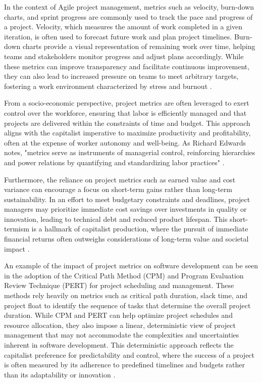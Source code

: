 \begin{refsection}
In the context of Agile project management, metrics such as velocity, burn-down charts, and sprint progress are commonly used to track the pace and progress of a project. Velocity, which measures the amount of work completed in a given iteration, is often used to forecast future work and plan project timelines. Burn-down charts provide a visual representation of remaining work over time, helping teams and stakeholders monitor progress and adjust plans accordingly. While these metrics can improve transparency and facilitate continuous improvement, they can also lead to increased pressure on teams to meet arbitrary targets, fostering a work environment characterized by stress and burnout \cite[pp.~87-90]{Schwaber2020AgileProjectManagement}.

From a socio-economic perspective, project metrics are often leveraged to exert control over the workforce, ensuring that labor is efficiently managed and that projects are delivered within the constraints of time and budget. This approach aligns with the capitalist imperative to maximize productivity and profitability, often at the expense of worker autonomy and well-being. As Richard Edwards notes, "metrics serve as instruments of managerial control, reinforcing hierarchies and power relations by quantifying and standardizing labor practices" \cite[pp.~157-160]{Edwards1980ContestedTerrain}.

Furthermore, the reliance on project metrics such as earned value and cost variance can encourage a focus on short-term gains rather than long-term sustainability. In an effort to meet budgetary constraints and deadlines, project managers may prioritize immediate cost savings over investments in quality or innovation, leading to technical debt and reduced product lifespan. This short-termism is a hallmark of capitalist production, where the pursuit of immediate financial returns often outweighs considerations of long-term value and societal impact \cite[pp.~45-48]{Harvey2007BriefHistory}.

An example of the impact of project metrics on software development can be seen in the adoption of the Critical Path Method (CPM) and Program Evaluation Review Technique (PERT) for project scheduling and management. These methods rely heavily on metrics such as critical path duration, slack time, and project float to identify the sequence of tasks that determine the overall project duration. While CPM and PERT can help optimize project schedules and resource allocation, they also impose a linear, deterministic view of project management that may not accommodate the complexities and uncertainties inherent in software development. This deterministic approach reflects the capitalist preference for predictability and control, where the success of a project is often measured by its adherence to predefined timelines and budgets rather than its adaptability or innovation \cite[pp.~203-205]{Meredith2021ProjectManagement}.


\end{refsection}
